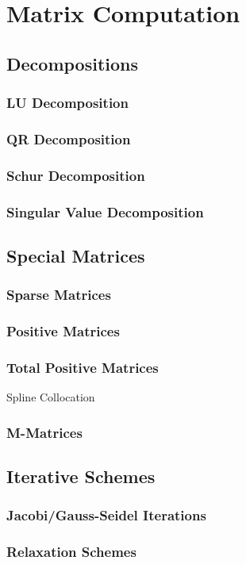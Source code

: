 \chapter{Matrix Computation}
\label{Ch: 8-Mat-Com}
\section{Decompositions}
\subsection{LU Decomposition}
\subsection{QR Decomposition}
\subsection{Schur Decomposition}
\subsection{Singular Value Decomposition}
\section{Special Matrices}
\subsection{Sparse Matrices}
\subsection{Positive Matrices}
\subsection{Total Positive Matrices}
Spline Collocation
\subsection{M-Matrices}
\section{Iterative Schemes}
\subsection{Jacobi/Gauss-Seidel Iterations}
\subsection{Relaxation Schemes}
